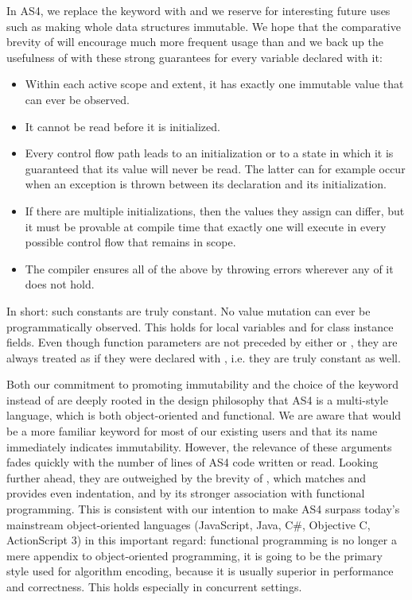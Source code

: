 In AS4, we replace the  keyword with  and we reserve
 for interesting future uses such as making whole data structures
immutable. We hope that the comparative brevity of  will encourage
much more frequent usage than  and we back up the usefulness of
 with these strong guarantees for every variable declared with it:
\begin{itemize}
  \item Within each active scope and extent, it has exactly one immutable value
  that can ever be observed.
  \item It cannot be read before it is initialized.
  \item Every control flow path leads to an initialization or to a
  state in which it is guaranteed that its value will never be read. The latter
  can for example occur when an exception is thrown between its declaration and
  its initialization.
  \item If there are multiple initializations, then the values they assign can
  differ, but it must be provable at compile time that exactly one will execute
  in every possible control flow that remains in scope.
  \item The compiler ensures all of the above by throwing errors wherever any of
  it does not hold.
\end{itemize}
In short: such constants are truly constant. No value mutation can ever be
programmatically observed. This holds for local variables and for
class instance fields. Even though function parameters are not preceded by
either  or , they are always treated as if they were
declared with , i.e. they are truly constant as well.

Both our commitment to promoting immutability and the choice of the keyword
 instead of  are deeply rooted in the design philosophy
that AS4 is a multi-style language, which is both object-oriented and
functional. We are aware that  would be a more familiar keyword for
most of our existing users and that its name immediately indicates immutability.
However, the relevance of these arguments fades quickly with the number of
lines of AS4 code written or read. Looking further ahead, they are outweighed by
the brevity of , which matches  and provides even
indentation, and by its stronger association with functional programming.
This is consistent with our intention to make AS4 surpass today's mainstream
object-oriented languages (JavaScript, Java, C\#, Objective C, ActionScript
3) in this important regard: functional programming is no longer a mere appendix to
object-oriented programming, it is going to be the primary style used for
algorithm encoding, because it is usually superior in performance and
correctness. This holds especially in concurrent settings.

